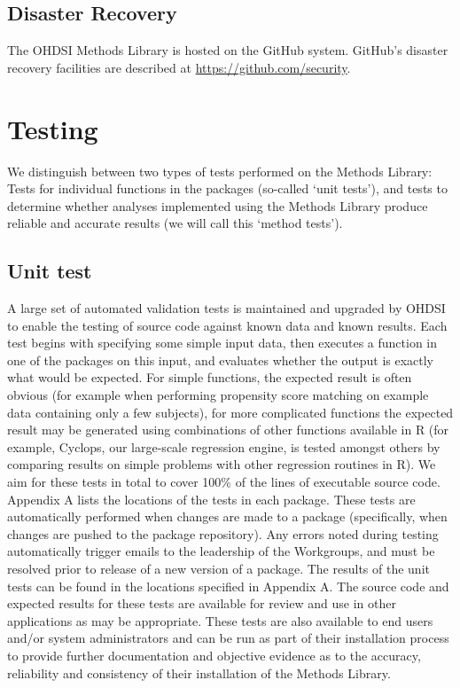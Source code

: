\documentclass[11pt]{book}
\begin{document}
\subsection{Disaster Recovery}\label{disaster-recovery}

The OHDSI Methods Library is hosted on the GitHub system. GitHub's
disaster recovery facilities are described at
\url{https://github.com/security}.

\section{Testing}\label{testing}

We distinguish between two types of tests performed on the Methods
Library: Tests for individual functions in the packages (so-called `unit
tests'), and tests to determine whether analyses implemented using the
Methods Library produce reliable and accurate results (we will call this
`method tests').

\subsection{Unit test}\label{unit-test}

A large set of automated validation tests is maintained and upgraded by
OHDSI to enable the testing of source code against known data and known
results. Each test begins with specifying some simple input data, then
executes a function in one of the packages on this input, and evaluates
whether the output is exactly what would be expected. For simple
functions, the expected result is often obvious (for example when
performing propensity score matching on example data containing only a
few subjects), for more complicated functions the expected result may be
generated using combinations of other functions available in R (for
example, Cyclops, our large-scale regression engine, is tested amongst
others by comparing results on simple problems with other regression
routines in R). We aim for these tests in total to cover 100\% of the
lines of executable source code. Appendix A lists the locations of the
tests in each package. These tests are automatically performed when
changes are made to a package (specifically, when changes are pushed to
the package repository). Any errors noted during testing automatically
trigger emails to the leadership of the Workgroups, and must be resolved
prior to release of a new version of a package. The results of the unit
tests can be found in the locations specified in Appendix A. The source
code and expected results for these tests are available for review and
use in other applications as may be appropriate. These tests are also
available to end users and/or system administrators and can be run as
part of their installation process to provide further documentation and
objective evidence as to the accuracy, reliability and consistency of
their installation of the Methods Library.
\end{document}
